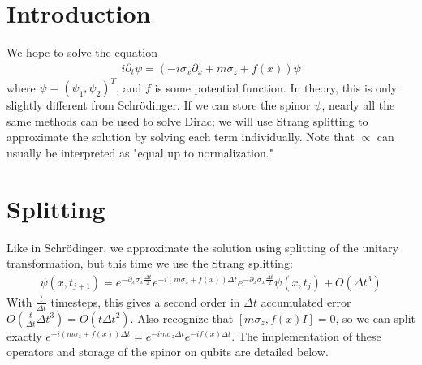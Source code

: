 \documentclass[10pt]{article}
\begin{document}
\section*{Introduction}
We hope to solve the equation 
\begin{align*} 
    i \partial_t \psi = (-i \sigma_x \partial_x + m \sigma_z + f(x))\psi
\end{align*}
where $\psi = (\psi_1, \psi_2)^T$, and $f$ is some potential function. In theory,
this is only slightly different from Schrödinger. If we can store the spinor $\psi$,
nearly all the same methods can be used to solve Dirac; we will use Strang splitting
to approximate the solution by solving each term individually. Note that $\propto$ can
usually be interpreted as "equal up to normalization."
\section*{Splitting}
Like in Schrödinger, we approximate the solution using splitting of the unitary transformation,
but this time we use the Strang splitting:
\begin{align*}
    \psi(x, t_{j+1}) = e^{-\partial_x \sigma_x \frac{\Delta t}{2}} e^{-i(m\sigma_z + f(x))\Delta t} e^{-\partial_x \sigma_x \frac{\Delta t}{2}} \psi(x, t_j) + O(\Delta t^3)
\end{align*}
With $\frac{t}{\Delta t}$ timesteps, this gives a second order in $\Delta t$ accumulated error 
$O(\frac{t}{\Delta t}\Delta t^3) = O(t \Delta t^2)$. Also recognize that $[m \sigma_z, f(x)I] = 0$,
so we can split exactly $e^{-i(m \sigma_z + f(x)) \Delta t} = e^{-im \sigma_z \Delta t} e^{-if(x) \Delta t}$. The
implementation of these operators and storage of the spinor on qubits are detailed below.
\end{document}
